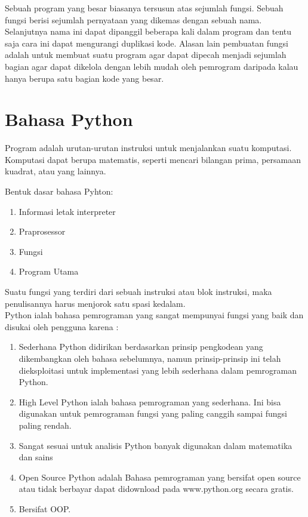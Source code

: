 \documentclass[12pt,a4paper]{article}
\begin{document}
Sebuah program yang besar biasanya tersusun atas sejumlah fungsi. Sebuah fungsi berisi sejumlah pernyataan yang dikemas dengan sebuah nama. Selanjutnya nama ini dapat dipanggil beberapa kali dalam program dan tentu saja cara ini dapat mengurangi duplikasi kode. Alasan lain pembuatan fungsi adalah untuk membuat suatu program agar
dapat dipecah menjadi sejumlah bagian agar dapat dikelola dengan lebih mudah oleh pemrogram daripada kalau hanya berupa satu bagian kode yang besar.

\section{Bahasa Python}
Program adalah urutan-urutan instruksi untuk menjalankan suatu komputasi. Komputasi dapat berupa matematis, seperti mencari bilangan prima, persamaan kuadrat, atau yang lainnya.

Bentuk dasar bahasa Pyhton:
\begin{enumerate}
\item Informasi letak interpreter
\item Praprosessor
\item Fungsi
\item Program Utama
\end{enumerate}

Suatu fungsi yang terdiri dari sebuah instruksi atau blok instruksi, maka penulisannya harus menjorok satu spasi kedalam. \\


Python ialah bahasa pemrograman yang sangat mempunyai fungsi yang baik dan disukai oleh pengguna karena :
\begin{enumerate}

\item Sederhana
Python didirikan berdasarkan prinsip pengkodean yang dikembangkan oleh bahasa sebelumnya, namun prinsip-prinsip ini telah dieksploitasi untuk implementasi yang lebih sederhana dalam pemrograman Python.

\item High Level
Python ialah bahasa pemrograman yang sederhana. Ini bisa digunakan untuk pemrograman fungsi yang paling canggih sampai fungsi paling rendah.

\item Sangat sesuai untuk analisis
 Python banyak digunakan dalam matematika dan sains
 
\item Open Source
Python adalah Bahasa pemrograman yang bersifat open source atau tidak berbayar dapat didownload pada www.python.org secara gratis.\\

\item Bersifat OOP.

\end{enumerate}
\end{document}
